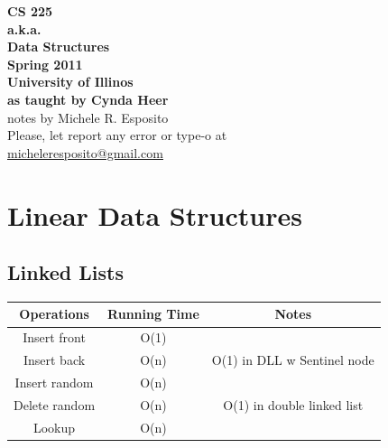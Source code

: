 \documentclass[a4paper]{article}
\begin{document}
\begin{center}

{\bf{\huge CS 225 }}\\
\vspace{ 0.5 cm }
{\bf{\huge a.k.a. }}\\
\vspace{ 0.5 cm }
{\bf{\huge Data Structures }}\\
\vspace{ 5 cm }
{\bf{\large Spring 2011}}\\
{\bf{\large University of Illinos}}\\
{\bf{\large as taught by Cynda Heer}}\\
\vspace{ 5 cm }                         
{\large notes by Michele R. Esposito}\\
\vspace{ 5cm }
Please, let report any error or type-o at\\
\underline{\href{mailto:micheleresposito@gmail.com}{ micheleresposito@gmail.com }}
\end{center}
\newpage
\tableofcontents
\newpage


\section{Linear Data Structures} %
\label{sec:Linear Data Structures}
\subsection{Linked Lists} %
\label{sub:Linked Lists}
\begin{tabular}{ | c | c | c |}
  \hline
  {\bf Operations } & {\bf Running Time} & {\bf Notes}  \\
  \hline
  Insert front  & O(1) & \\
  \hline
  Insert back   & O(n) & O(1) in DLL w Sentinel node \\
  \hline
  Insert random  & O(n) & \\
  \hline
  Delete random  & O(n) & O(1) in double linked list \\
  \hline
  Lookup  & O(n) & \\
  \hline
\end{tabular} \\
\end{document}
